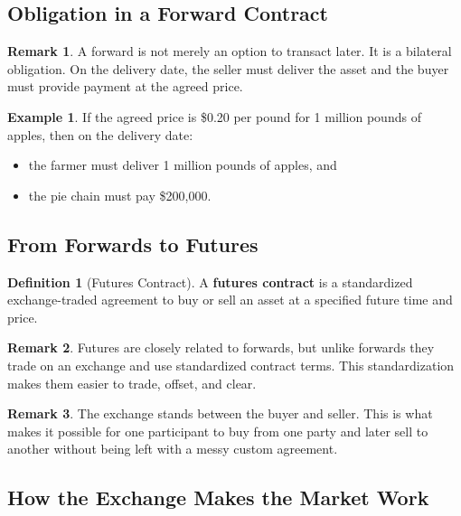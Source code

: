 \documentclass[11pt]{article}
\theoremstyle{definition}
\newtheorem{definition}{Definition}[section]
\newtheorem{example}{Example}[section]
\newtheorem{remark}{Remark}[section]
\begin{document}
\subsection{Obligation in a Forward Contract}

\begin{remark}
A forward is not merely an option to transact later. It is a bilateral obligation. On the delivery date, the seller must deliver the asset and the buyer must provide payment at the agreed price.
\end{remark}

\begin{example}
If the agreed price is \$0.20 per pound for 1 million pounds of apples, then on the delivery date:
\begin{itemize}[leftmargin=2em]
    \item the farmer must deliver 1 million pounds of apples, and
    \item the pie chain must pay \$200{,}000.
\end{itemize}
\end{example}

\subsection{From Forwards to Futures}

\begin{definition}[Futures Contract]
A \textbf{futures contract} is a standardized exchange-traded agreement to buy or sell an asset at a specified future time and price.
\end{definition}

\begin{remark}
Futures are closely related to forwards, but unlike forwards they trade on an exchange and use standardized contract terms. This standardization makes them easier to trade, offset, and clear.
\end{remark}

\begin{remark}
The exchange stands between the buyer and seller. This is what makes it possible for one participant to buy from one party and later sell to another without being left with a messy custom agreement.
\end{remark}

\subsection{How the Exchange Makes the Market Work}
\end{document}
